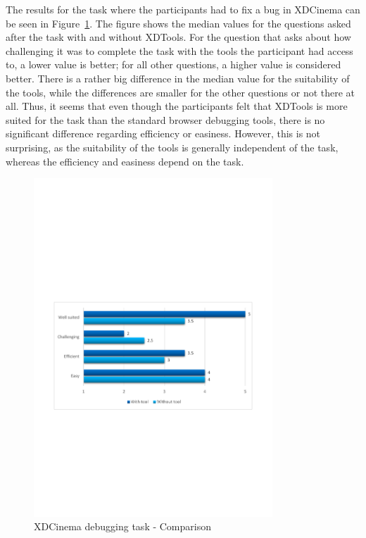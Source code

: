 The results for the task where the participants had to fix a bug in XDCinema can be seen in Figure~\ref{fig:xdc_bug_comparison}. The figure shows the median values for the questions asked after the task with and without XDTools. For the question that asks about how challenging it was to complete the task with the tools the participant had access to, a lower value is better; for all other questions, a higher value is considered better. There is a rather big difference in the median value for the suitability of the tools, while the differences are smaller for the other questions or not there at all. Thus, it seems that even though the participants felt that XDTools is more suited for the task than the standard browser debugging tools, there is no significant difference regarding efficiency or easiness. However, this is not surprising, as the suitability of the tools is generally independent of the task, whereas the efficiency and easiness depend on the task. 

\begin{figure}[H]
  \centering
    \includegraphics[width=0.8\textwidth]{images/charts/xdc_bug_comparison.pdf}
	\caption[xdc-bug: Comparison]{XDCinema debugging task - Comparison}
	\label{fig:xdc_bug_comparison}
\end{figure}


